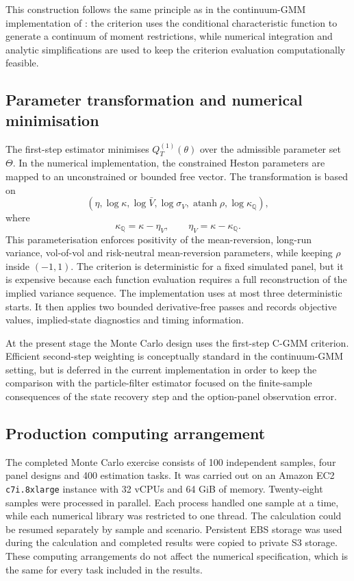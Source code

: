 \documentclass[11pt,a4paper,notitlepage]{article}
\numberwithin{equation}{section}
\begin{document}
This construction follows the same principle as in the continuum-GMM implementation of \citet{boswijk2015asset}: the criterion uses the conditional characteristic function to generate a continuum of moment restrictions, while numerical integration and analytic simplifications are used to keep the criterion evaluation computationally feasible.

\subsection{Parameter transformation and numerical minimisation}

The first-step estimator minimises \(Q_T^{(1)}(\theta)\) over the admissible parameter set \(\Theta\). In the numerical implementation, the constrained Heston parameters are mapped to an unconstrained or bounded free vector. The transformation is based on
\[
\left(
\eta,
\log\kappa,
\log\bar V,
\log\sigma_V,
\operatorname{atanh}\rho,
\log\kappa_{\mathbb Q}
\right),
\]
where
\[
\kappa_{\mathbb Q}=\kappa-\eta_V,
\qquad
\eta_V=\kappa-\kappa_{\mathbb Q}.
\]
This parameterisation enforces positivity of the mean-reversion, long-run variance, vol-of-vol and risk-neutral mean-reversion parameters, while keeping \(\rho\) inside \((-1,1)\). The criterion is deterministic for a fixed simulated panel, but it is expensive because each function evaluation requires a full reconstruction of the implied variance sequence. The implementation uses at most three deterministic starts. It then applies two bounded derivative-free passes and records objective values, implied-state diagnostics and timing information.

At the present stage the Monte Carlo design uses the first-step C-GMM criterion. Efficient second-step weighting is conceptually standard in the continuum-GMM setting, but is deferred in the current implementation in order to keep the comparison with the particle-filter estimator focused on the finite-sample consequences of the state recovery step and the option-panel observation error.

\subsection{Production computing arrangement}

The completed Monte Carlo exercise consists of 100 independent samples, four panel designs and 400 estimation tasks. It was carried out on an Amazon EC2 \texttt{c7i.8xlarge} instance with 32 vCPUs and 64 GiB of memory. Twenty-eight samples were processed in parallel. Each process handled one sample at a time, while each numerical library was restricted to one thread. The calculation could be resumed separately by sample and scenario. Persistent EBS storage was used during the calculation and completed results were copied to private S3 storage. These computing arrangements do not affect the numerical specification, which is the same for every task included in the results.


\newpage


\nocite{*}

\end{document}
